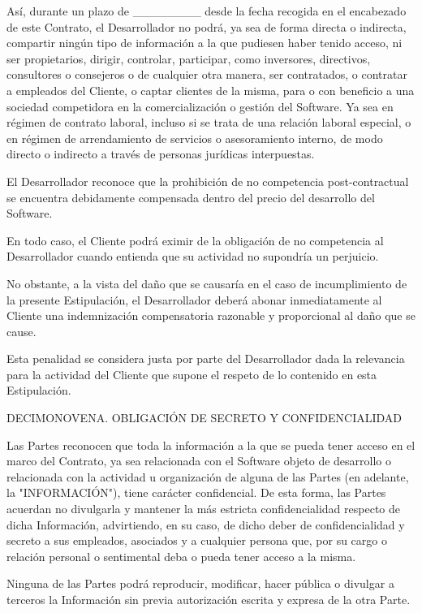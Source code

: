 \documentclass[a4paper,11pt]{report}
\begin{document}
Así, durante un plazo de \_\_\_\_\_\_\_\_ desde la fecha recogida en el
encabezado de este Contrato, el Desarrollador no podrá, ya sea de forma
directa o indirecta, compartir ningún tipo de información a la que
pudiesen haber tenido acceso, ni ser propietarios, dirigir, controlar,
participar, como inversores, directivos, consultores o consejeros o de
cualquier otra manera, ser contratados, o contratar a empleados del
Cliente, o captar clientes de la misma, para o con beneficio a una
sociedad competidora en la comercialización o gestión del Software. Ya
sea en régimen de contrato laboral, incluso si se trata de una relación
laboral especial, o en régimen de arrendamiento de servicios o
asesoramiento interno, de modo directo o indirecto a través de personas
jurídicas interpuestas.

El Desarrollador reconoce que la prohibición de no competencia
post-contractual se encuentra debidamente compensada dentro del precio
del desarrollo del Software.

En todo caso, el Cliente podrá eximir de la obligación de no competencia
al Desarrollador cuando entienda que su actividad no supondría un
perjuicio.

No obstante, a la vista del daño que se causaría en el caso de
incumplimiento de la presente Estipulación, el Desarrollador deberá
abonar inmediatamente al Cliente una indemnización compensatoria
razonable y proporcional al daño que se cause.

Esta penalidad se considera justa por parte del Desarrollador dada la
relevancia para la actividad del Cliente que supone el respeto de lo
contenido en esta Estipulación.

DECIMONOVENA. OBLIGACIÓN DE SECRETO Y CONFIDENCIALIDAD

Las Partes reconocen que toda la información a la que se pueda tener
acceso en el marco del Contrato, ya sea relacionada con el Software
objeto de desarrollo o relacionada con la actividad u organización de
alguna de las Partes (en adelante, la "INFORMACIÓN"), tiene carácter
confidencial. De esta forma, las Partes acuerdan no divulgarla y
mantener la más estricta confidencialidad respecto de dicha Información,
advirtiendo, en su caso, de dicho deber de confidencialidad y secreto a
sus empleados, asociados y a cualquier persona que, por su cargo o
relación personal o sentimental deba o pueda tener acceso a la misma.

Ninguna de las Partes podrá reproducir, modificar, hacer pública o
divulgar a terceros la Información sin previa autorización escrita y
expresa de la otra Parte.
\end{document}
